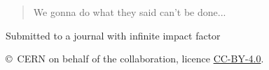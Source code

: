 \begin{titlepage}
\begin{abstract}
  \noindent
  We gonna do what they said can't be done...
 
\end{abstract}

\vspace*{2.0cm}

\begin{center}
  Submitted to a journal with infinite impact factor
\end{center}

\vspace{\fill}

{\footnotesize 
\centerline{\copyright~CERN on behalf of the \lhcb collaboration, licence \href{http://creativecommons.org/licenses/by/4.0/}{CC-BY-4.0}.}}
\vspace*{2mm}

\end{titlepage}



\newpage
\setcounter{page}{2}
\mbox{~}
%
%
%
%
%



\cleardoublepage







